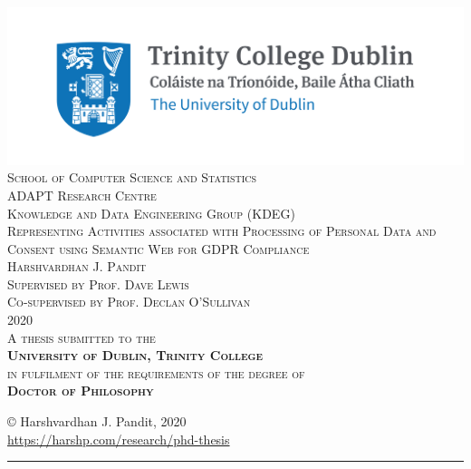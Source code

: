 \pagestyle{empty}
\begin{center}
\scshape
    \includegraphics{img/TCD_logo.png}\\[1cm] 
\large School of Computer Science and Statistics \\[0.25cm]
\small ADAPT Research Centre \\
\small Knowledge and Data Engineering Group (KDEG) \\[1.5cm]

\huge Representing Activities associated with Processing of Personal Data and Consent using Semantic Web for GDPR Compliance \\[1.5cm]
 
\Large Harshvardhan J. Pandit \\[1cm]

\large 
Supervised by Prof. Dave Lewis \\
Co-supervised by Prof. Declan O'Sullivan \\[1cm]

{\small 2020}\\[2cm]

\normalsize
A thesis submitted to the \\
\textbf{University of Dublin, Trinity College} \\
in fulfilment of the requirements of the degree of \\
\textbf{Doctor of Philosophy}

\normalsize

\vfill %
\end{center}
\restoregeometry

\cleardoublepage

\clearpage
\vspace*{\fill}
\begin{center}
    \centering
    \copyright\hspace{0.25cm} Harshvardhan J. Pandit, 2020\\
    \url{https://harshp.com/research/phd-thesis}
    \rule{\textwidth}{1pt}
    \doclicenseThis
    \vspace*{100px}
\end{center}
\vfill
\clearpage

